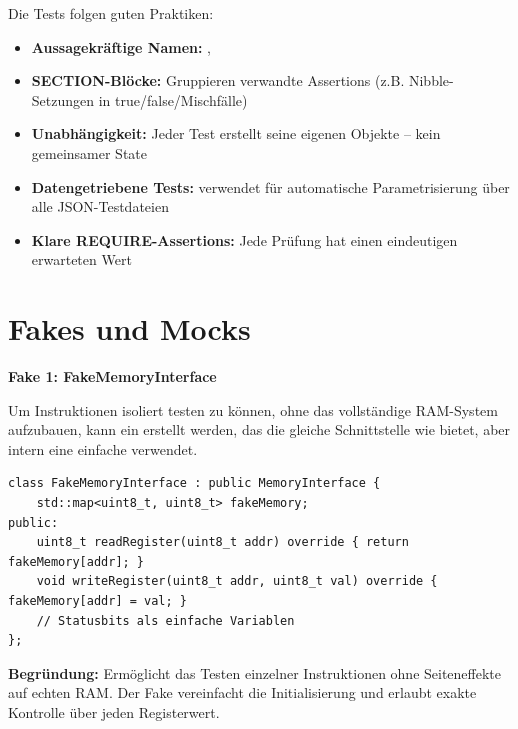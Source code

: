 Die Tests folgen guten Praktiken:

\begin{itemize}
    \item \textbf{Aussagekräftige Namen:} , 
    \item \textbf{SECTION-Blöcke:} Gruppieren verwandte Assertions (z.B. Nibble-Setzungen in true/false/Mischfälle)
    \item \textbf{Unabhängigkeit:} Jeder Test erstellt seine eigenen Objekte -- kein gemeinsamer State
    \item \textbf{Datengetriebene Tests:}  verwendet  für automatische Parametrisierung über alle JSON-Testdateien
    \item \textbf{Klare REQUIRE-Assertions:} Jede Prüfung hat einen eindeutigen erwarteten Wert
\end{itemize}

\section{Fakes und Mocks}

\textbf{Fake 1: FakeMemoryInterface}

Um Instruktionen isoliert testen zu können, ohne das vollständige RAM-System aufzubauen, kann ein  erstellt werden, das die gleiche Schnittstelle wie  bietet, aber intern eine einfache  verwendet.

\begin{lstlisting}[style=codeblock,language=picassocpp]
class FakeMemoryInterface : public MemoryInterface {
    std::map<uint8_t, uint8_t> fakeMemory;
public:
    uint8_t readRegister(uint8_t addr) override { return fakeMemory[addr]; }
    void writeRegister(uint8_t addr, uint8_t val) override { fakeMemory[addr] = val; }
    // Statusbits als einfache Variablen
};
\end{lstlisting}

\textbf{Begründung:} Ermöglicht das Testen einzelner Instruktionen ohne Seiteneffekte auf echten RAM. Der Fake vereinfacht die Initialisierung und erlaubt exakte Kontrolle über jeden Registerwert.



